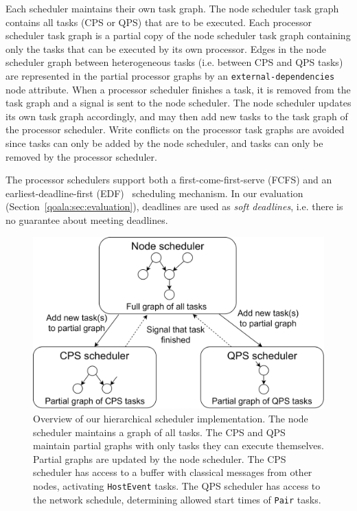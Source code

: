 Each scheduler maintains their own task graph.
The node scheduler task graph contains all tasks (CPS or QPS) that are to be executed.
Each processor scheduler task graph is a partial copy of the node scheduler task graph containing only the tasks that can be executed by its own processor.
Edges in the node scheduler graph between heterogeneous tasks (i.e. between CPS and QPS tasks) are represented in the partial processor graphs by an \texttt{external-dependencies} node attribute. 
When a processor scheduler finishes a task, it is removed from the task graph and a signal is sent to the node scheduler.
The node scheduler updates its own task graph accordingly, and may then add new tasks to the task graph of the processor scheduler.
Write conflicts on the processor task graphs are avoided since tasks can only be added by the node scheduler, and tasks can only be removed by the processor scheduler.

The processor schedulers support both a first-come-first-serve (FCFS) and an earliest-deadline-first (EDF)~\cite{silberschatz2006operating} scheduling mechanism.
In our evaluation (Section~\ref{qoala:sec:evaluation}), deadlines are used as \textit{soft deadlines}, i.e. there is no guarantee about meeting deadlines.

\begin{figure}%
    \centering
    \includegraphics[width=\columnwidth]{figures/qoala/scheduler_components.png}
    \caption{Overview of our hierarchical scheduler implementation.
    The node scheduler maintains a graph of all tasks. The CPS and QPS maintain partial graphs with only tasks they can execute themselves. Partial graphs are updated by the node scheduler. 
    The CPS scheduler has access to a buffer with classical messages from other nodes, activating \texttt{HostEvent} tasks. The QPS scheduler has access to the network schedule, determining allowed start times of \texttt{Pair} tasks.}
    \label{qoala:fig:scheduler_impl}
\end{figure}




